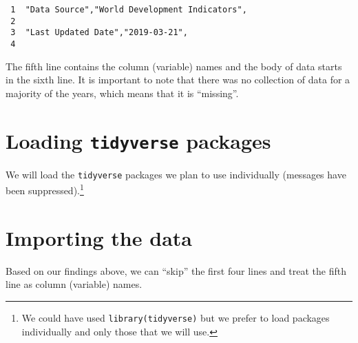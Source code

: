 \documentclass[a4paper,9pt,twocolumn,twoside,printwatermark=false]{pinp}
\begin{document}
\begin{verbatim}
 1  ﻿"Data Source","World Development Indicators",
 2  
 3  "Last Updated Date","2019-03-21",
 4  
\end{verbatim}

The fifth line contains the column (variable) names and the body of data
starts in the sixth line. It is important to note that there was no
collection of data for a majority of the years, which means that it is
``missing''.

\hypertarget{loading-tidyverse-packages}{%
\section{\texorpdfstring{Loading \texttt{tidyverse}
packages}{Loading tidyverse packages}}\label{loading-tidyverse-packages}}

We will load the \texttt{tidyverse} packages we plan to use individually
(messages have been suppressed).\footnote{We could have used
  \texttt{library(tidyverse)} but we prefer to load packages
  individually and only those that we will use.}

\begin{Shaded}
\begin{Highlighting}[]
\end{Highlighting}
\end{Shaded}

\hypertarget{importing-the-data}{%
\section{Importing the data}\label{importing-the-data}}

Based on our findings above, we can ``skip'' the first four lines and
treat the fifth line as column (variable) names.

\begin{Shaded}
\begin{Highlighting}[]
\StringTok{ }\NormalTok{(}\NormalTok{(}\NormalTok{, }\NormalTok{), }
              \NormalTok{)}
\end{Highlighting}
\end{Shaded}
\end{document}
